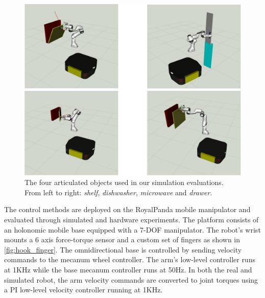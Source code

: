 \begin{figure}[t]
\centering
  \includegraphics[width=0.7\columnwidth]{framework_manipulation/figures/mosaics/articulated_objects_sim_2x2.pdf}
  \caption{The four articulated objects used in our simulation evaluations. From left to right: \textit{shelf}, \textit{dishwasher}, \textit{microwave} and \textit{drawer}.} \label{fig:object_manipulation}
\end{figure}


The control methods are deployed on the RoyalPanda mobile manipulator and evaluated through simulated and hardware experiments. The platform consists of an holonomic mobile base equipped with a 7-DOF manipulator. The robot's wrist mounts a 6 axis force-torque sensor and a custom set of fingers as shown in \fig\ref{fig:hook_finger}.  The omnidirectional base is controlled by sending velocity commands to the mecanum wheel controller. The arm's low-level controller runs at 1KHz while the base mecanum controller runs at 50Hz. In both the real and simulated robot, the arm velocity commands are converted to joint torques using a PI low-level velocity controller running at 1KHz. 


